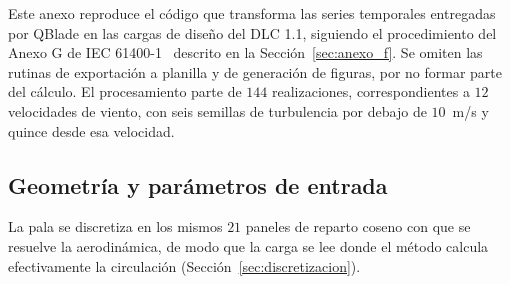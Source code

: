 
Este anexo reproduce el código que transforma las series temporales entregadas por QBlade en las cargas de diseño del DLC 1.1, siguiendo el procedimiento del Anexo G de IEC 61400-1~\parencite*{IEC61400-1} descrito en la Sección~\ref{sec:anexo_f}. Se omiten las rutinas de exportación a planilla y de generación de figuras, por no formar parte del cálculo. El procesamiento parte de $144$ realizaciones, correspondientes a $12$ velocidades de viento, con seis semillas de turbulencia por debajo de $10$~m/s y quince desde esa velocidad.

\subsection*{Geometría y parámetros de entrada}

La pala se discretiza en los mismos $21$ paneles de reparto coseno con que se resuelve la aerodinámica, de modo que la carga se lee donde el método calcula efectivamente la circulación (Sección~\ref{sec:discretizacion}).

